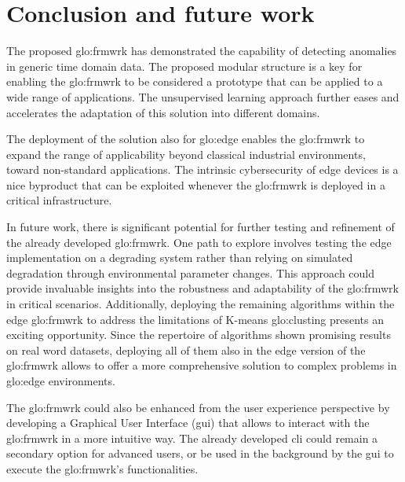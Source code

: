 \chapter{Conclusion and future work}
\label{ch:Conclusion}

The proposed \gls{glo:frmwrk} has demonstrated the capability of detecting anomalies in generic time domain data. The proposed modular structure is a key for enabling the \gls{glo:frmwrk} to be considered a prototype that can be applied to a wide range of applications. The unsupervised learning approach further eases and accelerates the adaptation of this solution into different domains. 

The deployment of the solution also for \gls{glo:edge} enables the \gls{glo:frmwrk} to expand the range of applicability beyond classical industrial environments, toward non-standard applications. The intrinsic cybersecurity of edge devices is a nice byproduct that can be exploited whenever the \gls{glo:frmwrk} is deployed in a critical infrastructure.

In future work, there is significant potential for further testing and refinement of the already developed \gls{glo:frmwrk}. One path to explore involves testing the edge implementation on a degrading system rather than relying on simulated degradation through environmental parameter changes. This approach could provide invaluable insights into the robustness and adaptability of the \gls{glo:frmwrk} in critical scenarios. Additionally, deploying the remaining algorithms within the edge \gls{glo:frmwrk} to address the limitations of K-means \gls{glo:clust}ing presents an exciting opportunity. Since the repertoire of algorithms shown promising results on real word datasets, deploying all of them also in the edge version of the \gls{glo:frmwrk} allows to offer a more comprehensive solution to complex problems in \gls{glo:edge} environments.

The \gls{glo:frmwrk} could also be enhanced from the user experience perspective by developing a Graphical User Interface (\gls{gui}) that allows to interact with the \gls{glo:frmwrk} in a more intuitive way. The already developed \gls{cli} could remain a secondary option for advanced users, or be used in the background by the \gls{gui} to execute the \gls{glo:frmwrk}'s functionalities. 